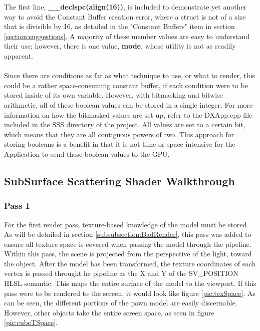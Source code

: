 \documentclass[a4paper, 12pt]{article}
\begin{document}
\noindent The first line, \textbf{\_\_declspc(align(16))}, is included to
demonstrate yet another way to avoid the Constant Buffer creation error, where
a struct is not of a size that is divisible by 16, as detailed in the
"Constant Buffers" item in section \ref{section:suggestions}. A majority of
these member values are easy to understand their use; however, there is one
value, \textbf{mode}, whose utility is not as readily apparent. \\ \\ Since
there are conditions as far as what technique to use, or what to render, this
could be a rather space-consuming constant buffer, if each condition were to
be stored inside of its own variable. However, with bitmasking and bitwise
arithmetic, all of these boolean values can be stored in a single integer. For
more information on how the bitmasked values are set up, refer to the
DXApp.cpp file included in the SSS directory of the project. All values are
set to a certain bit, which means that they are all contiguous powers of two.
This approach for storing booleans is a benefit in that it is not time or
space intensive for the Application to send these boolean values to the GPU.

\subsection{SubSurface Scattering Shader Walkthrough} 

\label{subsection:SSSImplementation}

\subsubsection{Pass 1}

For the first render pass, texture-based knowledge of the model must be
stored. As will be detailed in section \ref{subsubsection:BadRender}, this
pass was added to ensure all texture space is covered when passing the model
through the pipeline. Within this pass, the scene is projected from the
perspective of the light, toward the object. After the model has been
transformed, the texture coordinates of each vertex is passed throught he
pipeline as the X and Y of the SV\_POSITION HLSL semantic. This maps the
entire surface of the model to the viewport. If this pass were to be rendered
to the screen, it would look like figure \ref{pic:texSpace}. As can be seen,
the different portions of the pawn model are easily discernable. However,
other objects take the entire screen space, as seen in figure
\ref{pic:cubeTSpace}. 
\end{document}
